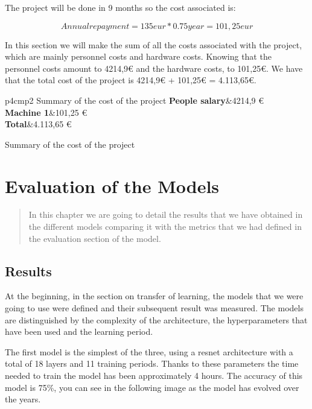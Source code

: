 The project will be done in 9 months so the cost associated is:

\[Annual repayment = 135 eur * 0.75 year = 101,25 eur\]


\newpage
In this section we will make the sum of all the costs associated with the project, which are mainly personnel costs and hardware costs. Knowing that the personnel costs amount to 4214,9€ and the hardware costs, to 101,25€. We have that the total cost of the project is 4214,9€ + 101,25€ = 4.113,65€. 
\FloatBarrier
\begin{table}[htb]
	\centering
	\begin{coolTable}{p{4cm}p{\textwidth-4.5cm}}{2}
{Summary of the cost of the project}
	\textbf{People salary}&4214,9 €\\		
	\textbf{Machine 1}&101,25 €\\
	\textbf{Total}&4.113,65 €\\
	\end{coolTable}
	\caption{Summary of the cost of the project}
\end{table}
\FloatBarrier


\chapter{Evaluation of the Models}

\begin{abstract}
In this chapter we are going to detail the results that we have obtained in the different models comparing it with the metrics that we had defined in the evaluation section of the model.
\end{abstract}


\section{Results}

At the beginning, in the section on transfer of learning, the models that we were going to use were defined and their subsequent result was measured. The models are distinguished by the complexity of the architecture, the hyperparameters that have been used and the learning period. 

The first model is the simplest of the three, using a resnet architecture with a total of 18 layers and 11 training periods. Thanks to these parameters the time needed to train the model has been approximately 4 hours.
The accuracy of this model is 75\%, you can see in the following image as the model has evolved over the years.


